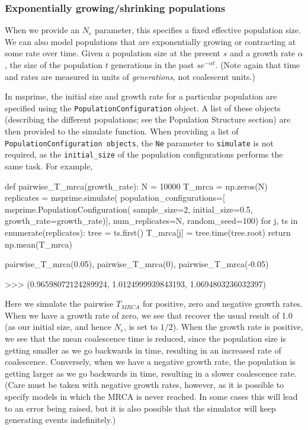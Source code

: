 \documentclass[graybox]{svmult}
\begin{document}
\subsubsection{Exponentially growing/shrinking
populations}\label{exponentially-growingshrinking-populations}

When we provide an \(N_e\) parameter, this specifies a fixed effective
population size. We can also model populations that are exponentially
growing or contracting at some rate over time. Given a population size
at the present \(s\) and a growth rate \(\alpha\), the size of the
population \(t\) generations in the past \(s e^{-\alpha t}\). (Note
again that time and rates are measured in units of \emph{generations},
not coalescent units.)

In msprime, the initial size and growth rate for a particular population
are specified using the \texttt{PopulationConfiguration} object. A list
of these objects (describing the different populations; see the
Population Structure section) are then provided to the simulate
function. When providing a list of
\texttt{PopulationConfiguration\ objects}, the \texttt{Ne} parameter to
\texttt{simulate} is not required, as the \texttt{initial\_size} of the
population configurations performs the same task. For example,

\begin{pythoncode}
def pairwise_T_mrca(growth_rate):
    N = 10000
    T_mrca = np.zeros(N)
    replicates = msprime.simulate(
        population_configurations=[
             msprime.PopulationConfiguration(
                sample_size=2, initial_size=0.5, growth_rate=growth_rate)],
        num_replicates=N, random_seed=100)
    for j, ts in enumerate(replicates):
        tree = ts.first()
        T_mrca[j] = tree.time(tree.root)
    return np.mean(T_mrca)

pairwise_T_mrca(0.05), pairwise_T_mrca(0), pairwise_T_mrca(-0.05)

>>> (0.96598072124289924, 1.0124999939843193, 1.0694803236032397)

\end{pythoncode}


    Here we simulate the pairwise \(T_{MRCA}\) for positive, zero and
negative growth rates. When we have a growth rate of zero, we see that
recover the usual result of 1.0 (as our initial size, and hence \(N_e\),
is set to \(1/2\)). When the growth rate is positive, we see that the
mean coalescence time is reduced, since the population size is getting
smaller as we go backwards in time, resulting in an increased rate of
coalescence. Conversely, when we have a negative growth rate, the
population is getting larger as we go backwards in time, resulting in a
slower coalescence rate. (Care must be taken with negative growth rates,
however, as it is possible to specify models in which the MRCA is never
reached. In some cases this will lead to an error being raised, but it
is also possible that the simulator will keep generating events
indefinitely.)
\end{document}
